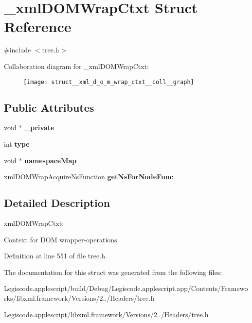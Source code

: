\hypertarget{struct__xml_d_o_m_wrap_ctxt}{\section{\-\_\-xml\-D\-O\-M\-Wrap\-Ctxt Struct Reference}
\label{struct__xml_d_o_m_wrap_ctxt}
}


{\ttfamily \#include $<$tree.\-h$>$}



Collaboration diagram for \-\_\-xml\-D\-O\-M\-Wrap\-Ctxt\-:
\nopagebreak
\begin{figure}[H]
\begin{center}
\leavevmode
\texttt{[image: struct\_\_xml\_d\_o\_m\_wrap\_ctxt\_\_coll\_\_graph]}
\end{center}
\end{figure}
\subsection*{Public Attributes}
\begin{DoxyCompactItemize}
\item 
\hypertarget{struct__xml_d_o_m_wrap_ctxt_a6edb4ec2526ffa6b6fb8953f07631b92}{void $\ast$ {\bfseries \-\_\-private}}\label{struct__xml_d_o_m_wrap_ctxt_a6edb4ec2526ffa6b6fb8953f07631b92}

\item 
\hypertarget{struct__xml_d_o_m_wrap_ctxt_a1d84b623242d09de1c0ea065e5411fbc}{int {\bfseries type}}\label{struct__xml_d_o_m_wrap_ctxt_a1d84b623242d09de1c0ea065e5411fbc}

\item 
\hypertarget{struct__xml_d_o_m_wrap_ctxt_a02a32279ef2bf5905a81dde8ec72b469}{void $\ast$ {\bfseries namespace\-Map}}\label{struct__xml_d_o_m_wrap_ctxt_a02a32279ef2bf5905a81dde8ec72b469}

\item 
\hypertarget{struct__xml_d_o_m_wrap_ctxt_a2fc065d32c83c5d1cdbd49f8162c7340}{xml\-D\-O\-M\-Wrap\-Acquire\-Ns\-Function {\bfseries get\-Ns\-For\-Node\-Func}}\label{struct__xml_d_o_m_wrap_ctxt_a2fc065d32c83c5d1cdbd49f8162c7340}

\end{DoxyCompactItemize}


\subsection{Detailed Description}
xml\-D\-O\-M\-Wrap\-Ctxt\-:

Context for D\-O\-M wrapper-\/operations. 

Definition at line 551 of file tree.\-h.



The documentation for this struct was generated from the following files\-:\begin{DoxyCompactItemize}
\item 
Legiscode.\-applescript/build/\-Debug/\-Legiscode.\-applescript.\-app/\-Contents/\-Frameworks/libxml.\-framework/\-Versions/2../\-Headers/tree.\-h\item 
Legiscode.\-applescript/libxml.\-framework/\-Versions/2../\-Headers/tree.\-h\end{DoxyCompactItemize}
